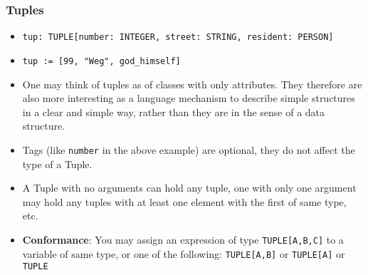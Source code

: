 \documentclass[a4paper]{article}
\newcommand{\inline}[1]{\lstinline!#1!}%
\begin{document}
\subsubsection{Tuples}
\begin{itemize}
\item \inline{tup: TUPLE[number: INTEGER, street: STRING, resident: PERSON]}
\item \inline{tup := [99, "Weg", god_himself]}
\item One may think of tuples as of classes with only attributes. They therefore are also more interesting as a language mechanism to describe simple structures in a clear and simple way, rather than they are in the sense of a data structure.
\item Tags (like \inline{number} in the above example) are optional, they do not affect the type of a Tuple. 
\item A Tuple with no arguments can hold any tuple, one with only one argument may hold any tuples with at least one element with the first of same type, etc.
\item \textbf{Conformance}: You may assign an expression of type \inline{TUPLE[A,B,C]} to a variable of same type, or one of the following: \inline{TUPLE[A,B]} or \inline{TUPLE[A]} or \inline{TUPLE}
\end{itemize}
\end{document}

